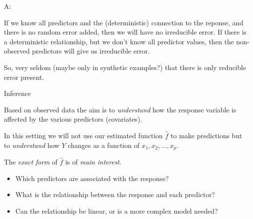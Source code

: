 \documentclass[ignorenonframetext,]{beamer}
\providecommand{\tightlist}{%
  \setlength{\itemsep}{0pt}\setlength{\parskip}{0pt}}
\begin{document}
\begin{frame}

\begin{block}{A:}

If we know all predictors and the (deterministic) connection to the
reponse, and there is no random error added, then we will have no
irreducible error. If there is a deterministic relationship, but we
don't know all predictor values, then the non-observed predictors will
give us irreducible error.

So, very seldom (maybe only in synthetic examples?) that there is only
reducible error present.

\end{block}

\end{frame}

\begin{frame}

\begin{block}{Inference}

Based on observed data the aim is to \emph{understand} how the response
variable is affected by the various predictors (covariates).

In this setting we will not use our estimated function \(\hat{f}\) to
make predictions but to \emph{understand} how \(Y\) changes as a
function of \(x_1, x_2, ..., x_p\).

The \emph{exact form} of \(\hat{f}\) is of \emph{main interest}.

\begin{itemize}
\tightlist
\item
  Which predictors are associated with the response?
\item
  What is the relationship between the response and each predictor?
\item
  Can the relationship be linear, or is a more complex model needed?
\end{itemize}

\end{block}

\end{frame}
\end{document}
